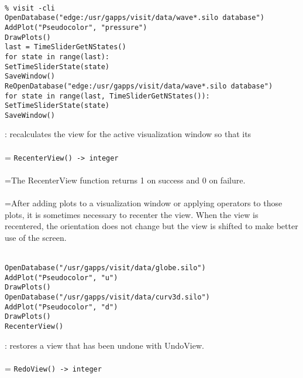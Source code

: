 \documentclass[10pt,a4paper]{report}
\begin{document}
\\[-6mm]
\begin{verbatim}% visit -cli
OpenDatabase("edge:/usr/gapps/visit/data/wave*.silo database")
AddPlot("Pseudocolor", "pressure")
DrawPlots()
last = TimeSliderGetNStates()
for state in range(last):
SetTimeSliderState(state)
SaveWindow()
ReOpenDatabase("edge:/usr/gapps/visit/data/wave*.silo database")
for state in range(last, TimeSliderGetNStates()):
SetTimeSliderState(state)
SaveWindow()
\end{verbatim}
\newpage


{}
: recalculates the view for the active visualization window so that its\\[-3mm]

 \\ 
\hangindent=\parindent 
\verb!RecenterView() -> integer!\\ [-3mm]

 \\ 
\hangindent=\parindent The RecenterView function returns 1 on success and 0 on failure. \\[-3mm] 

 \\ 
\hangindent=\parindent After adding plots to a visualization window or applying operators to those plots, it is sometimes necessary to recenter the view. When the view is recentered, the orientation does not change but the view is shifted to make better use of the screen. \\[-3mm] 

\\[-6mm]
\begin{verbatim}OpenDatabase("/usr/gapps/visit/data/globe.silo")
AddPlot("Pseudocolor", "u")
DrawPlots()
OpenDatabase("/usr/gapps/visit/data/curv3d.silo")
AddPlot("Pseudocolor", "d")
DrawPlots()
RecenterView()
\end{verbatim}
\newpage


{}
: restores a view that has been undone with UndoView.\\[-3mm]

 \\ 
\hangindent=\parindent 
\verb!RedoView() -> integer!\\ [-3mm]
\end{document}
